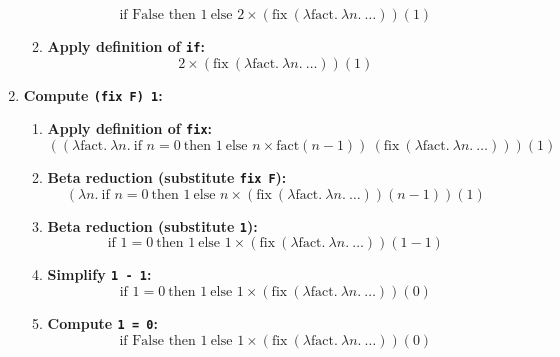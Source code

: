 \documentclass{article}
\begin{document}
\begin{enumerate}
\begin{enumerate}
\begin{equation*}
        \text{if False then } 1\ \text{else } 2 \times \left( \text{fix}\ (\lambda \text{fact}.\ \lambda n.\ \ldots) \right)(1)
        \end{equation*}
        \item \textbf{Apply definition of \texttt{if}:}
        \begin{equation*}
        2 \times \left( \text{fix}\ (\lambda \text{fact}.\ \lambda n.\ \ldots) \right)(1)
        \end{equation*}
    \end{enumerate}
    \item \textbf{Compute \texttt{(fix F) 1}:}
    \begin{enumerate}
        \item \textbf{Apply definition of \texttt{fix}:}
        \begin{equation*}
        \left( (\lambda \text{fact}.\ \lambda n.\ \text{if } n = 0\ \text{then } 1\ \text{else } n \times \text{fact}(n - 1))\ \left( \text{fix}\ (\lambda \text{fact}.\ \lambda n.\ \ldots) \right) \right)(1)
        \end{equation*}
        \item \textbf{Beta reduction (substitute \texttt{fix F}):}
        \begin{equation*}
        \left( \lambda n.\ \text{if } n = 0\ \text{then } 1\ \text{else } n \times \left( \text{fix}\ (\lambda \text{fact}.\ \lambda n.\ \ldots) \right)(n - 1) \right)(1)
        \end{equation*}
        \item \textbf{Beta reduction (substitute \texttt{1}):}
        \begin{equation*}
        \text{if } 1 = 0\ \text{then } 1\ \text{else } 1 \times \left( \text{fix}\ (\lambda \text{fact}.\ \lambda n.\ \ldots) \right)(1 - 1)
        \end{equation*}
        \item \textbf{Simplify \texttt{1 - 1}:}
        \begin{equation*}
        \text{if } 1 = 0\ \text{then } 1\ \text{else } 1 \times \left( \text{fix}\ (\lambda \text{fact}.\ \lambda n.\ \ldots) \right)(0)
        \end{equation*}
        \item \textbf{Compute \texttt{1 = 0}:}
        \begin{equation*}
        \text{if False then } 1\ \text{else } 1 \times \left( \text{fix}\ (\lambda \text{fact}.\ \lambda n.\ \ldots) \right)(0)
        \end{equation*}

\end{enumerate}
\end{enumerate}
\end{document}
